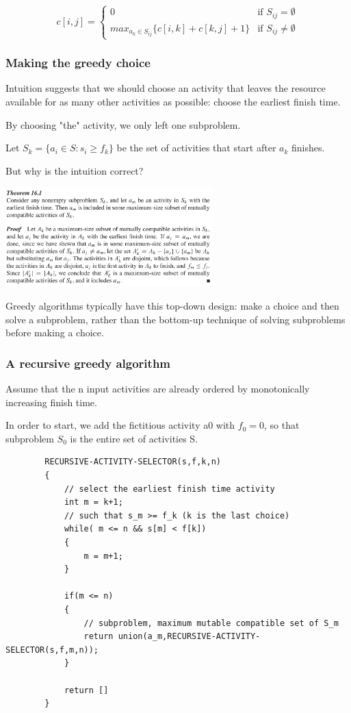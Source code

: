     \[ c[i,j]= \begin{cases} 
        0 & \text{if } S_{ij}=\emptyset \\
        max_{a_k \in S_{ij}} \lbrace c[i,k]+c[k,j]+1 \rbrace &
        \text{if } S_{ij} \neq \emptyset
     \end{cases}
    \]
  
\subsubsection*{Making the greedy choice}


    Intuition suggests that we should choose an activity that leaves the resource available
    for as many other activities as possible: choose the earliest finish time.

    By choosing "the" activity, we only left one subproblem.
    
    Let $S_k = \lbrace a_i \in S: s_i \geq f_k \rbrace$ be the set of activities
    that start after $a_k$ finishes.

    But why is the intuition correct?

    \includegraphics[width=0.6\textwidth]{contents/Advanced_Design/Greedy/greedy_image/proof_earliest_finish_time.png}

    Greedy algorithms typically have this top-down design: make a
    choice and then solve a subproblem, 
    rather than the bottom-up technique of solving
    subproblems before making a choice.


\subsubsection*{A recursive greedy algorithm}

     Assume that the n input activities are already ordered 
     by monotonically increasing ﬁnish time.

     In order to start, we add the ﬁctitious 
     activity a0 with $f_0=0$, so that subproblem $S_0$ is
    the entire set of activities S.

    \begin{lstlisting}
        RECURSIVE-ACTIVITY-SELECTOR(s,f,k,n)
        {
            // select the earliest finish time activity
            int m = k+1;
            // such that s_m >= f_k (k is the last choice)
            while( m <= n && s[m] < f[k])
            {
                m = m+1;
            }

            if(m <= n)
            {
                // subproblem, maximum mutable compatible set of S_m
                return union(a_m,RECURSIVE-ACTIVITY-SELECTOR(s,f,m,n));
            }

            return []
        }
    \end{lstlisting}



